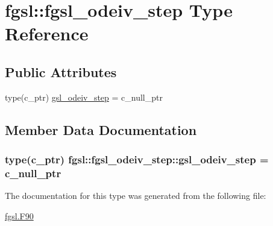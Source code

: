 \hypertarget{structfgsl_1_1fgsl__odeiv__step}{}\section{fgsl\+:\+:fgsl\+\_\+odeiv\+\_\+step Type Reference}
\label{structfgsl_1_1fgsl__odeiv__step}
\subsection*{Public Attributes}
\begin{DoxyCompactItemize}
\item 
type(c\+\_\+ptr) \hyperlink{structfgsl_1_1fgsl__odeiv__step_a1a7adfeea10c02a0a4fabca3a03bb3d2}{gsl\+\_\+odeiv\+\_\+step} = c\+\_\+null\+\_\+ptr
\end{DoxyCompactItemize}


\subsection{Member Data Documentation}
\hypertarget{structfgsl_1_1fgsl__odeiv__step_a1a7adfeea10c02a0a4fabca3a03bb3d2}{}
\subsubsection[{gsl\+\_\+odeiv\+\_\+step}]{\setlength{\rightskip}{0pt plus 5cm}type(c\+\_\+ptr) fgsl\+::fgsl\+\_\+odeiv\+\_\+step\+::gsl\+\_\+odeiv\+\_\+step = c\+\_\+null\+\_\+ptr}\label{structfgsl_1_1fgsl__odeiv__step_a1a7adfeea10c02a0a4fabca3a03bb3d2}


The documentation for this type was generated from the following file\+:\begin{DoxyCompactItemize}
\item 
\hyperlink{fgsl_8F90}{fgsl.\+F90}\end{DoxyCompactItemize}
